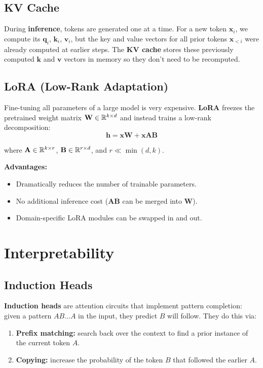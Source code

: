 \documentclass[main.tex]{subfiles}
\begin{document}
\subsection{KV Cache}

During \textbf{inference}, tokens are generated one at a time. For a new token $\mathbf{x}_i$, we compute its $\mathbf{q}_i$, $\mathbf{k}_i$, $\mathbf{v}_i$, but the key and value vectors for all prior tokens $\mathbf{x}_{<i}$ were already computed at earlier steps. The \textbf{KV cache} stores these previously computed $\mathbf{k}$ and $\mathbf{v}$ vectors in memory so they don't need to be recomputed.

\subsection{LoRA (Low-Rank Adaptation)}

Fine-tuning all parameters of a large model is very expensive. \textbf{LoRA} freezes the pretrained weight matrix $\mathbf{W} \in \mathbb{R}^{k \times d}$ and instead trains a low-rank decomposition:
$$\mathbf{h} = \mathbf{x}\mathbf{W} + \mathbf{x}\mathbf{A}\mathbf{B} \tag{8.54}$$

where $\mathbf{A} \in \mathbb{R}^{k \times r}$, $\mathbf{B} \in \mathbb{R}^{r \times d}$, and $r \ll \min(d, k)$.

\textbf{Advantages:}
\begin{itemize}
    \item Dramatically reduces the number of trainable parameters.
    \item No additional inference cost ($\mathbf{AB}$ can be merged into $\mathbf{W}$).
    \item Domain-specific LoRA modules can be swapped in and out.
\end{itemize}

\section{Interpretability}

\subsection{Induction Heads}

\textbf{Induction heads} are attention circuits that implement pattern completion: given a pattern $AB \ldots A$ in the input, they predict $B$ will follow. They do this via:
\begin{enumerate}
    \item \textbf{Prefix matching:} search back over the context to find a prior instance of the current token $A$.
    \item \textbf{Copying:} increase the probability of the token $B$ that followed the earlier $A$.
\end{enumerate}
\end{document}
